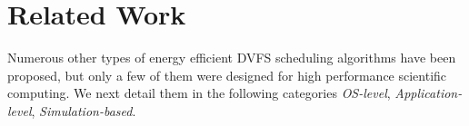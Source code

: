 \documentclass[12pt]{elsarticle}
\begin{document}
\begin{comment}
\subsection{Energy Efficiency vs. ScaLAPACK/DPLASMA \textnormal{\textsf{pdpotrf()}}}

Next we compare energy efficiency of our rewritten \textsf{pdpotrf()} with the \emph{TDS} approach against another two widely-used implementations of distributed Cholesky factorization: ScaLAPACK and DPLASMA \textsf{pdpotrf()}, where Bosilca \textit{et al.} \cite{dplasma} demonstrated that compared to ScaLAPACK \textsf{pdpotrf()}, DPLASMA \textsf{pdpotrf()} has similar performance and weak scalability on current distributed architectures. Figure \ref{energy_performance_hpcl} depicts the energy and performance efficiency of ScaLAPACK and DPLASMA \textsf{pdpotrf()} on the HPCL cluster with an Ethernet switch. We observe that performance efficiency of DPLASMA degrades as the global matrix size increases, and Li \textit{et al.} \cite{ccgrid14} observed the similar trend on a cluster with an Infiniband switch. Due to this trend, performance and energy efficiency of our \textsf{pdpotrf()} with the \emph{TDS} approach is lower than DPLASMA \textsf{pdpotrf()} when the global matrix size is small (less than 10240 in our experiments). Overall, compared to ScaLAPACK and DPLASMA \textsf{pdpotrf()}, our \textsf{pdpotrf()} saves more energy (against ScaLAPACK: 51.7\% on average and up to 56.3\%; against DPLASMA: 11.5\% on average and up to 39.6\%). Experimental results also show that DPLASMA \textsf{pdpotrf()} is more energy efficient than ScaLAPACK \textsf{pdpotrf()} with all global matrix sizes measured.\end{comment}


\section{Related Work}

Numerous other types of energy efficient DVFS scheduling algorithms have been proposed, but only a few of them were designed for high performance scientific computing. We next detail them in the following categories \emph{OS-level}, \emph{Application-level}, \emph{Simulation-based}.
\end{document}
